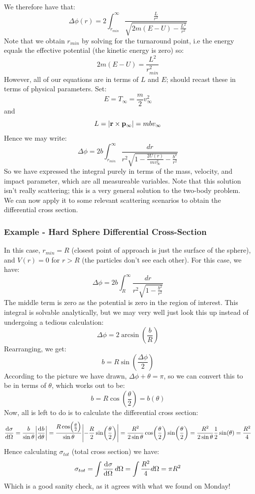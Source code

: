 \documentclass[../PHYS306Notes.tex]{subfiles}
\begin{document}
We therefore have that:
\[\Delta \phi(r) = 2\int_{r_{min}}^\infty \frac{\frac{L}{r^2}}{\sqrt{2m(E-U) - \frac{L^2}{r^2}}}\]
Note that we obtain $r_{min}$ by solving for the turnaround point, i.e the energy equals the effective potential (the kinetic energy is zero) so:
\[2m(E - U) = \frac{L^2}{r_{min}^2}\]
However, all of our equations are in terms of $L$ and $E$;  should recast these in terms of physical parameters. Set:
\[E = T_{\infty} = \frac{m}{2}v_{\infty}^2\]
and 
\[L = \abs{\mathbf{r} \times \mathbf{p}_{\infty}} = mbv_{\infty}\]
Hence we may write:
\[\Delta \phi = 2b\int_{r_{min}}^\infty \frac{dr}{r^2\sqrt{1 - \frac{2U(r)}{mv_{\infty}^2} - \frac{b^2}{r^2}}}\]
So we have expressed the integral purely in terms of the mass, velocity, and impact parameter, which are all measureable variables. Note that this solution isn't really scattering; this is a very general solution to the two-body problem. 
We can now apply it to some relevant scattering scenarios to obtain the differential cross section.

\subsubsection{Example - Hard Sphere Differential Cross-Section}
In this case, $r_{min} = R$ (closest point of approach is just the surface of the sphere), and $V(r) = 0$ for $r > R$ (the particles don't see each other). For this case, we have:
\[\Delta \phi = 2b\int_R^\infty\frac{dr}{r^2\sqrt{1 - \frac{b^2}{r^2}}}\]
The middle term is zero as the potential is zero in the region of interest. This integral is solvable analytically, but we may very well just look this up instead of undergoing a tedious calculation:
\[\Delta \phi = 2\arcsin(\frac{b}{R})\]
Rearranging, we get:
\[b = R\sin(\frac{\Delta \phi}{2})\]
According to the picture we have drawn, $\Delta \phi + \theta = \pi$, so we can convert this to be in terms of $\theta$, which works out to be:
\[b = R\cos(\frac{\theta}{2}) = b(\theta)\]
Now, all is left to do is to calculate the differential cross section:
\[\dod{\sigma}{\Omega} = \frac{b}{\sin\theta}\abs{\dod{b}{\theta}} = \frac{R\cos(\frac{\theta}{2})}{\sin\theta}\abs{-\frac{R}{2}\sin(\frac{\theta}{2})} = \frac{R^2}{2\sin\theta}\cos(\frac{\theta}{2})\sin(\frac{\theta}{2}) = \frac{R^2}{2\sin\theta}\frac{1}{2}\sin(\theta) = \frac{R^2}{4}\]
Hence calculating $\sigma_{tot}$ (total cross section) we have:
\[\sigma_{tot} = \int \dod{\sigma}{\Omega}d\Omega = \int \frac{R^2}{4}d\Omega = \pi R^2\]
Which is a good sanity check, as it agrees with what we found on Monday!
\end{document}
